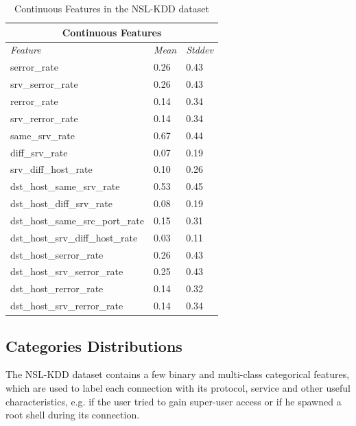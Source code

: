 \begin{table}[]
    \centering
    \begin{tabular}{|l|l|l|}
    \hline
    \multicolumn{3}{|c|}{\textbf{Continuous Features}} \\ \hline
    \textit{Feature}     & \textit{Mean} & \textit{Stddev} \\ \hline
    serror\_rate  & 0.26      & 0.43  \\ \hline
    srv\_serror\_rate  & 0.26      & 0.43  \\ \hline
    rerror\_rate  & 0.14      & 0.34  \\ \hline
    srv\_rerror\_rate  & 0.14      & 0.34  \\ \hline
    same\_srv\_rate    & 0.67      & 0.44  \\ \hline
    diff\_srv\_rate    & 0.07      & 0.19  \\ \hline
    srv\_diff\_host\_rate   & 0.10      & 0.26  \\ \hline
    dst\_host\_same\_srv\_rate   & 0.53      & 0.45  \\ \hline
    dst\_host\_diff\_srv\_rate   & 0.08      & 0.19  \\ \hline
    dst\_host\_same\_src\_port\_rate  & 0.15      & 0.31  \\ \hline
    dst\_host\_srv\_diff\_host\_rate  & 0.03      & 0.11  \\ \hline
    dst\_host\_serror\_rate     & 0.26      & 0.43  \\ \hline
    dst\_host\_srv\_serror\_rate     & 0.25      & 0.43  \\ \hline
    dst\_host\_rerror\_rate     & 0.14      & 0.32  \\ \hline
    dst\_host\_srv\_rerror\_rate     & 0.14      & 0.34  \\ \hline
    \end{tabular}
    \caption{Continuous Features in the NSL-KDD dataset}
    \label{tab:cont}
\end{table}



\subsection{Categories Distributions}

The NSL-KDD dataset contains a few binary and multi-class categorical features, which are used to label each connection with its protocol, service and other useful characteristics, e.g. if the user tried to gain super-user access or if he spawned a root shell during its connection. 

